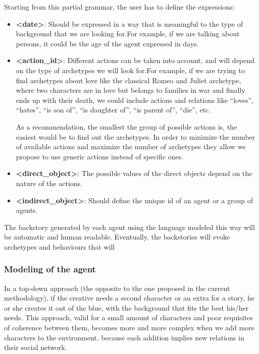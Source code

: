 \documentclass{sig-alternate}
\begin{document}
Starting from this partial grammar, the user has to define the expressions:
\begin{itemize}
\item \textbf{<date>}: Should be expressed in a way that is meaningful to the type of background that we are looking for.For example, if we are talking about persons, it could be the age of the agent expressed in days.

\item \textbf{<action\_id>}: Different actions can be taken into account, and will depend on the type of archetypes we will look for.For example, if we are trying to find archetypes about love like the classical Romeo and Juliet archetype, where two characters are in love but belongs to families in war and finally ends up with their death, we could include actions and relations like ``loves'', ``hates'', ``is son of'', ``is daughter of'', ``is parent of'', ``die'', etc.

As a recommendation, the smallest the group of possible actions is, the easiest would be to find out the archetypes. In order to minimize the number of available actions and maximize the number of archetypes they allow we propose to use generic actions instead of specific ones.

\item \textbf{<direct\_object>}: The possible values of the direct objects depend on the nature of the actions.

\item \textbf{<indirect\_object>}: Should define the unique id of an agent or a group of agents.

\end{itemize}

The backstory generated by each agent using the language modeled this way will be automatic and human readable. Eventually, the backstories will evoke archetypes and behaviours that will  



\subsubsection{Modeling of the agent}


In a top-down approach (the opposite to the one proposed in the current methodology), if the creative needs a second character or an extra for a story, he or she creates it out of the blue, with the background that fits the best his/her needs. This approach, valid for a small amount of characters and poor requisites of coherence between them, becomes more and more complex when we add more characters to the environment, because each addition implies new relations in their social network.
\end{document}
